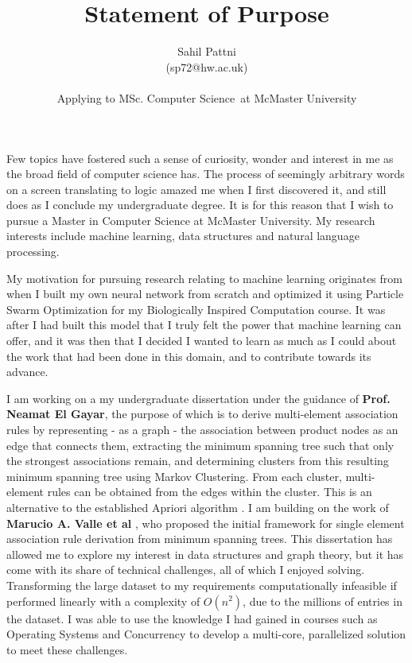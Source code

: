 \documentclass[a4paper,11pt]{article}
\newcommand{\uni}{McMaster University}
\newcommand{\program}{MSc. Computer Science}
\newcommand{\supervisor}{\textbf{Prof. Neamat El Gayar}}
\begin{document}
\title{Statement of Purpose}

\author{Sahil Pattni\\(sp72@hw.ac.uk)\\\\Applying to \program\  at \uni}
\date{}
\maketitle

Few topics have fostered such a sense of curiosity, wonder and interest in me as the broad field of computer science has. The process of seemingly arbitrary words on a screen translating to logic amazed me when I first discovered it, and still does as I conclude my undergraduate degree. It is for this reason that I wish to pursue a Master in Computer Science at \uni. My research interests include machine learning, data structures and natural language processing.

My motivation for pursuing research relating to machine learning originates from when I built my own neural network from scratch and optimized it using Particle Swarm Optimization for my Biologically Inspired Computation course. It was after I had built this model that I truly felt the power that machine learning can offer, and it was then that I decided I wanted to learn as much as I could about the work that had been done in this domain, and to contribute towards its advance.

I am working on a my undergraduate dissertation under the guidance of \supervisor, the purpose of which is to derive multi-element association rules by representing - as a graph - the association between product nodes as an edge that connects them, extracting the minimum spanning tree such that only the strongest associations remain, and determining clusters from this resulting minimum spanning tree using Markov Clustering. From each cluster, multi-element rules can be obtained from the edges within the cluster. This is an alternative to the established Apriori algorithm \cite{apriori}. I am building on the work of \textbf{Marucio A. Valle et al} \cite{mst_paper}, who proposed the initial framework for single element association rule derivation from minimum spanning trees. This dissertation has allowed me to explore my interest in data structures and graph theory, but it has come with its share of technical challenges, all of which I enjoyed solving. Transforming the large dataset to my requirements computationally infeasible if performed linearly with a complexity of $O(n^2)$, due to the millions of entries in the dataset. I was able to use the knowledge I had gained in courses such as Operating Systems and Concurrency to develop a multi-core, parallelized solution to meet these challenges.
\end{document}
